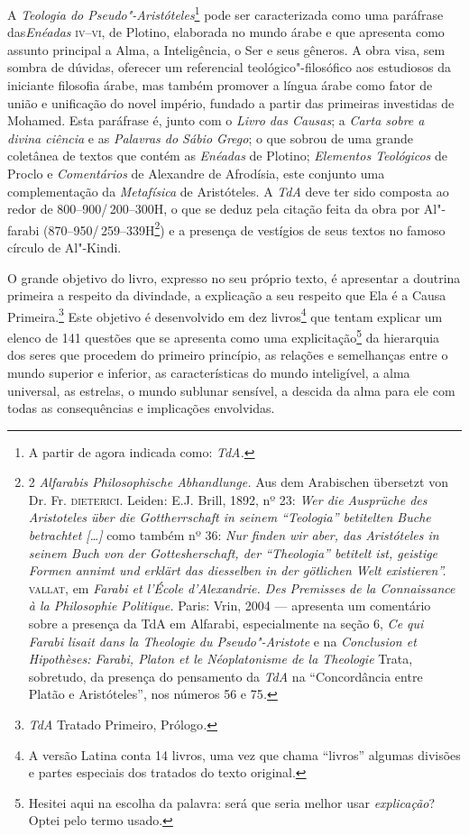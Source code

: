 A \emph{Teologia do Pseudo"-Aristóteles}\footnote{ A partir de
agora indicada como: \emph{TdA.}} pode ser
caracterizada como uma paráfrase das\emph{Enéadas} \textsc{iv}--\textsc{vi}, de Plotino,
elaborada no mundo árabe e que apresenta como assunto principal
a Alma, a Inteligência, o Ser e seus gêneros. A obra visa, sem
sombra de dúvidas, oferecer um referencial teológico"-filosófico
aos estudiosos da iniciante filosofia árabe, mas também promover
a língua árabe como fator de união e unificação do novel
império, fundado a partir das primeiras investidas de Mohamed.
Esta paráfrase é, junto com o \emph{Livro das Causas}; a
\emph{Carta sobre a divina ciência} e as \emph{Palavras do
Sábio Grego}; o que sobrou de uma grande coletânea de
textos que contém as \emph{Enéadas} de Plotino; \emph{Elementos Teológicos} de Proclo 
e \emph{Comentários} de Alexandre de Afrodísia, este conjunto uma
complementação da \emph{Metafísica} de Aristóteles. A 
\emph{TdA} deve ter sido composta ao redor de
800--900/\,200--300H, o que se deduz pela citação feita da obra por
Al"-farabi (870--950/\,259--339H\footnote{2\emph{
    Alfarabis Philosophische Abhandlunge.} Aus dem Arabischen übersetzt
    von{ Dr. Fr. \textsc{dieterici}}. Leiden: E.J. Brill, 1892, nº 23:
    \emph{Wer die Ausprüche des Aristoteles über die Gottherrschaft in seinem
    “Teologia” betitelten Buche betrachtet [\ldots{}]} como também nº 36:
    \emph{Nur finden wir aber, das Aristóteles in seinem Buch von der
    Gottesherschaft, der “Theologia” betitelt ist, geistige Formen annimt und
    erklärt das diesselben in der götlichen Welt existieren”.}
    \textsc{vallat},  em \emph{Farabi et l'École
    d'Alexandrie. Des Premisses de la Connaissance à la Philosophie Politique.}
    Paris: Vrin, 2004 --- apresenta um comentário sobre a presença da TdA em
    Alfarabi, especialmente na seção 6, \emph{Ce qui Farabi lisait dans la
    Theologie du Pseudo"-Aristote} e na \emph{Conclusion et Hipothèses: Farabi,
    Platon et le Néoplatonisme de la Theologie}  Trata, sobretudo, da presença
    do pensamento da \emph{TdA} na “Concordância entre Platão e Aristóteles”,
    nos números  56 e 75\emph{.}})
e a presença de vestígios de seus
textos no famoso círculo de Al"-Kindi.

O grande objetivo do livro, expresso no seu próprio texto, é
apresentar a doutrina primeira a respeito da divindade, a
explicação a seu respeito que Ela é a Causa Primeira.\footnote{
\emph{TdA} Tratado Primeiro, Prólogo\emph{.}} Este objetivo
é desenvolvido em dez livros\footnote{ A versão Latina conta
14 livros, uma vez que chama “livros” algumas divisões e partes
especiais dos tratados do texto  original.} que tentam explicar
um elenco de 141 questões que se apresenta como uma
explicitação\footnote{ Hesitei aqui na escolha da palavra: será
que seria melhor usar \emph{explicação}? Optei pelo termo
usado.} da hierarquia dos seres que procedem do primeiro princípio, as
relações e semelhanças entre o mundo superior e inferior, as
características do mundo inteligível, a alma universal, as
estrelas, o mundo sublunar sensível, a descida da alma para ele
com todas as consequências e implicações envolvidas.


